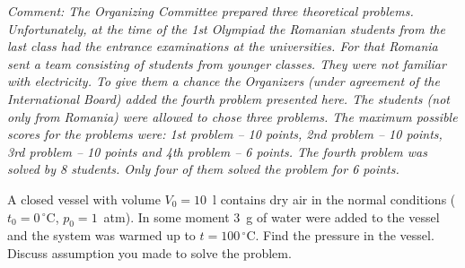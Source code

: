 \textit{Comment: The Organizing Committee prepared three theoretical problems.
Unfortunately, at the time of the 1st Olympiad the Romanian students from the
last class had the entrance examinations at the universities. For that Romania
sent a team consisting of students from younger classes. They were not familiar
with electricity. To give them a chance the Organizers (under agreement of the
International Board) added the fourth problem presented here. The students (not
only from Romania) were allowed to chose three problems. The maximum possible
scores for the problems were: 1st problem -- 10 points, 2nd problem -- 10 points,
3rd problem -- 10 points and 4th problem -- 6 points. The fourth problem was
solved by 8 students. Only four of them solved the problem for 6 points.}

\medskip
A closed vessel with volume $V_0 = 10$~l contains dry air in the normal
conditions ($t_0 = 0\,^\circ\mathrm{C}$, $p_0 = 1$~atm). In some moment 3~g of
water were added to the vessel and the system was warmed up to
$t = 100\,^\circ\mathrm{C}$. Find the pressure in the vessel. Discuss
assumption you made to solve the problem.
